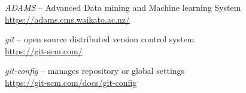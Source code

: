 
\begin{thebibliography}{999}

		\textit{ADAMS} -- Advanced Data mining and Machine learning System \\
		\url{https://adams.cms.waikato.ac.nz/}{}

	 	\textit{git} -- open source distributed version control system \\
		\url{https://git-scm.com/}{}

	 	\textit{git-config} -- manages repository or global settings \\
		\url{https://git-scm.com/docs/git-config}{}

\end{thebibliography}
